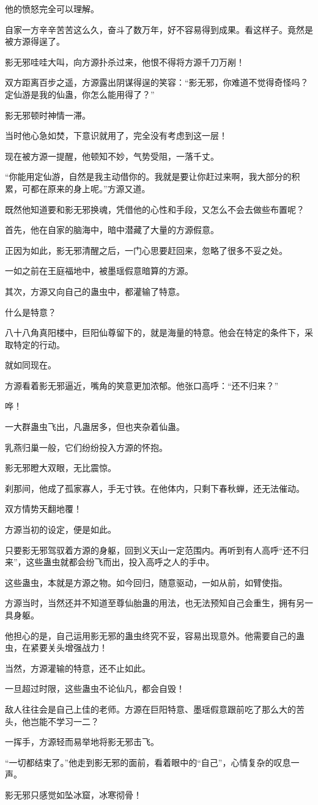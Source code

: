 \begin{this_body}
他的愤怒完全可以理解。

自家一方辛辛苦苦这么久，奋斗了数万年，好不容易得到成果。看这样子。竟然是被方源得逞了。

影无邪哇哇大叫，向方源扑杀过来，他恨不得将方源千刀万剐！

双方距离百步之遥，方源露出阴谋得逞的笑容：“影无邪，你难道不觉得奇怪吗？定仙游是我的仙蛊，你怎么能用得了？”

影无邪顿时神情一滞。

当时他心急如焚，下意识就用了，完全没有考虑到这一层！

现在被方源一提醒，他顿知不妙，气势受阻，一落千丈。

“你能用定仙游，自然是我主动借你的。我就是要让你赶过来啊，我大部分的积累，可都在原来的身上呢。”方源又道。

既然他知道要和影无邪换魂，凭借他的心性和手段，又怎么不会去做些布置呢？

首先，他在自家的脑海中，暗中潜藏了大量的方源假意。

正因为如此，影无邪清醒之后，一门心思要赶回来，忽略了很多不妥之处。

一如之前在王庭福地中，被墨瑶假意暗算的方源。

其次，方源又向自己的蛊虫中，都灌输了特意。

什么是特意？

八十八角真阳楼中，巨阳仙尊留下的，就是海量的特意。他会在特定的条件下，采取特定的行动。

就如同现在。

方源看着影无邪逼近，嘴角的笑意更加浓郁。他张口高呼：“还不归来？”

哗！

一大群蛊虫飞出，凡蛊居多，但也夹杂着仙蛊。

乳燕归巢一般，它们纷纷投入方源的怀抱。

影无邪瞪大双眼，无比震惊。

刹那间，他成了孤家寡人，手无寸铁。在他体内，只剩下春秋蝉，还无法催动。

双方情势天翻地覆！

方源当初的设定，便是如此。

只要影无邪驾驭着方源的身躯，回到义天山一定范围内。再听到有人高呼“还不归来”，这些蛊虫就都会纷飞而出，投入高呼之人的手中。

这些蛊虫，本就是方源之物。如今回归，随意驱动，一如从前，如臂使指。

方源当时，当然还并不知道至尊仙胎蛊的用法，也无法预知自己会重生，拥有另一具身躯。

他担心的是，自己运用影无邪的蛊虫终究不妥，容易出现意外。他需要自己的蛊虫，在紧要关头增强战力！

当然，方源灌输的特意，还不止如此。

一旦超过时限，这些蛊虫不论仙凡，都会自毁！

敌人往往会是自己上佳的老师。方源在巨阳特意、墨瑶假意跟前吃了那么大的苦头，他岂能不学习一二？

一挥手，方源轻而易举地将影无邪击飞。

“一切都结束了。”他走到影无邪的面前，看着眼中的“自己”，心情复杂的叹息一声。

影无邪只感觉如坠冰窟，冰寒彻骨！

\end{this_body}

